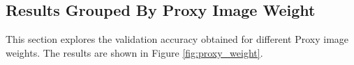 \subsection{Results Grouped By Proxy Image Weight}
This section explores the validation accuracy obtained for different Proxy image weights. The results are shown in Figure \ref{fig:proxy_weight}. 



